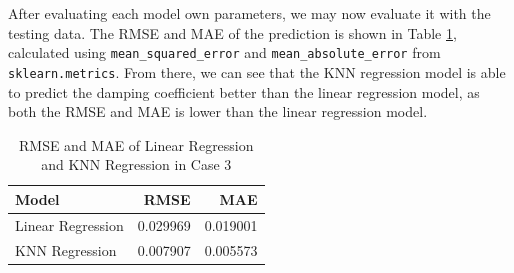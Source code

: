 \documentclass[conf]{new-aiaa}
\begin{document}
After evaluating each model own parameters, we may now evaluate it with the testing data. The RMSE and MAE of the prediction is shown in Table \ref{tab:case3_lr_knnr_rmse_mae}, calculated using \texttt{mean\_squared\_error} and \texttt{mean\_absolute\_error} from \texttt{sklearn.metrics}. From there, we can see that the KNN regression model is able to predict the damping coefficient better than the linear regression model, as both the RMSE and MAE is lower than the linear regression model.
\begin{table}[H]
    \centering
    \caption{\label{tab:case3_lr_knnr_rmse_mae} RMSE and MAE of Linear Regression and KNN Regression in Case 3}
    \begin{tabular}{lrr}
        \toprule
        Model &      RMSE &       MAE \\
        \midrule
        Linear Regression &  0.029969 &  0.019001 \\
        KNN Regression    &  0.007907 &  0.005573 \\
        \bottomrule
    \end{tabular}
\end{table}
\end{document}
